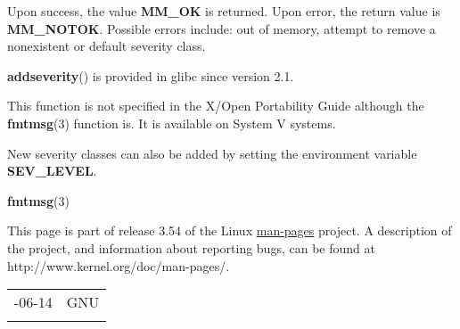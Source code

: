 \documentclass[]{article}
\let\realtextbf=\textbf
\renewcommand{\textbf}[1]{\textcolor{boldcolor}{\realtextbf{#1}}}
\renewcommand{\emph}[1]{\underline{#1}}
\begin{document}

Upon success, the value \textbf{MM\_OK} is returned. Upon error, the
return value is \textbf{MM\_NOTOK}. Possible errors include: out of
memory, attempt to remove a nonexistent or default severity class.


\textbf{addseverity}() is provided in glibc since version 2.1.


This function is not specified in the X/Open Portability Guide although
the \textbf{fmtmsg}(3) function is. It is available on System V systems.


New severity classes can also be added by setting the environment
variable \textbf{SEV\_LEVEL}.


\textbf{fmtmsg}(3)


This page is part of release 3.54 of the Linux \emph{man-pages} project.
A description of the project, and information about reporting bugs, can
be found at http://www.kernel.org/doc/man-pages/.

\begin{longtable}[c]{@{}ll@{}}
\toprule\addlinespace
2008-06-14 & GNU
\\\addlinespace
\bottomrule
\end{longtable}
\end{document}
